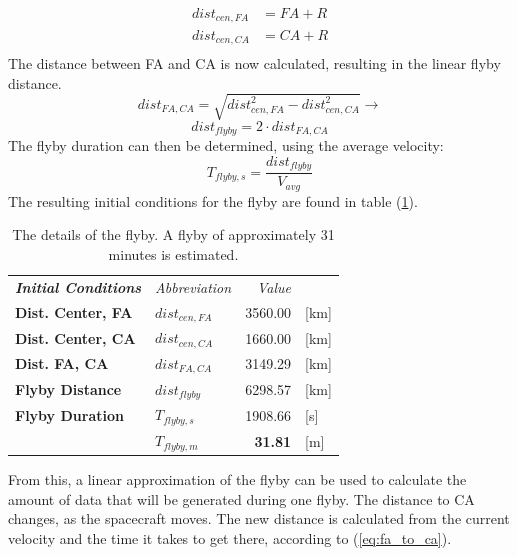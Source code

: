 \begin{equation}\label{eq:dist_centers}
\begin{split}
dist_{cen,FA} &= FA+R\\
dist_{cen,CA} &= CA+R\\
\end{split}
\end{equation}
The distance between FA and CA is now calculated, resulting in the linear flyby distance.
\begin{equation}\label{eq:dist_fa_ca}
dist_{FA, CA} = \sqrt{dist_{cen,FA}^2-dist_{cen,CA}^2} \rightarrow
\end{equation}
\begin{equation}\label{eq:dist_flyby_dist}
dist_{flyby} = 2\cdot dist_{FA, CA}
\end{equation}
The flyby duration can then be determined, using the average velocity:
\begin{equation}
T_{flyby,s} = \frac{dist_{flyby}}{V_{avg}}
\end{equation}
The resulting initial conditions for the flyby are found in table (\ref{tab:flyby_init_cond}).
\begin{table}[h!]
  \centering
    \begin{tabular}{l|l|r|l}
\textit{\textbf{Initial Conditions}} & \textit{Abbreviation} & \multicolumn{1}{r}{\textit{Value}} &  \bigstrut[b]\\
\cline{1-3}\textbf{Dist. Center, FA} & $dist_{cen,FA}$ & 3560.00 & [km] \bigstrut[t]\\
\textbf{Dist. Center, CA} & $dist_{cen,CA}$ & 1660.00 & [km] \bigstrut[b]\\
\cline{1-3}\textbf{Dist. FA, CA} & $dist_{FA, CA}$ & 3149.29 & [km] \bigstrut[t]\\
\textbf{Flyby Distance} & $dist_{flyby}$ & 6298.57 & [km] \bigstrut[b]\\
\cline{1-3}\textbf{Flyby Duration} & $T_{flyby,s}$ & 1908.66 & [s] \bigstrut[t]\\
      & $T_{flyby,m}$ & \textbf{31.81} & [m] \\
\end{tabular}%
  \caption{The details of the flyby. A flyby of approximately 31 minutes is estimated.}
  \label{tab:flyby_init_cond}%
\end{table}%
From this, a linear approximation of the flyby can be used to calculate the amount of data that will be generated during one flyby. The distance to CA changes, as the spacecraft moves. The new distance is calculated from the current velocity and the time it takes to get there, according to (\ref{eq:fa_to_ca}).
